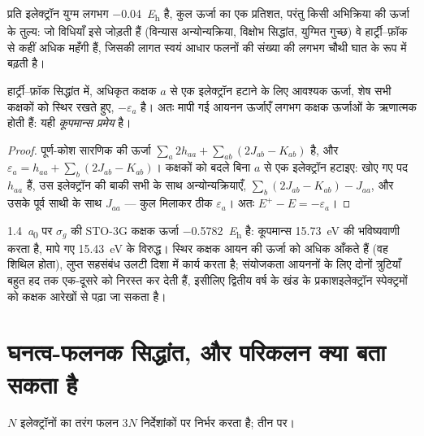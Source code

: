  प्रति इलेक्ट्रॉन युग्म लगभग \qty{-0.04}{\hartree} है, कुल ऊर्जा का
एक प्रतिशत, परंतु किसी अभिक्रिया की ऊर्जा के तुल्य:
जो विधियाँ इसे जोड़ती हैं (विन्यास अन्योन्यक्रिया, विक्षोभ सिद्धांत,
युग्मित गुच्छ) वे हार्ट्री--फ़ॉक से कहीं अधिक महँगी हैं, जिसकी लागत स्वयं
आधार फलनों की संख्या की लगभग चौथी घात के रूप में बढ़ती है।

\begin{theorem}[कूपमान्स प्रमेय]\label{thm:b3:computational-chemistry:koopmans}
हार्ट्री--फ़ॉक सिद्धांत में, अधिकृत कक्षक $a$ से एक इलेक्ट्रॉन हटाने के लिए
आवश्यक ऊर्जा, शेष सभी कक्षकों को स्थिर रखते हुए, $-\varepsilon_a$ है। अतः
मापी गई आयनन ऊर्जाएँ लगभग कक्षक ऊर्जाओं के ऋणात्मक होती हैं:
यही \emph{कूपमान्स प्रमेय} है।
\end{theorem}

\begin{proof}
पूर्ण-कोश सारणिक की ऊर्जा $\sum_a2h_{aa} + \sum_{ab}(2J_{ab} -
K_{ab})$ है, और $\varepsilon_a = h_{aa} + \sum_b(2J_{ab} - K_{ab})$। कक्षकों को बदले बिना
$a$ से एक इलेक्ट्रॉन हटाइए: खोए गए पद $h_{aa}$ हैं, उस इलेक्ट्रॉन की
बाकी सभी के साथ अन्योन्यक्रियाएँ, $\sum_b(2J_{ab} - K_{ab}) -
J_{aa}$, और उसके पूर्व साथी के साथ $J_{aa}$ --- कुल मिलाकर ठीक
$\varepsilon_a$। अतः $E^+ - E = -\varepsilon_a$।
\end{proof}

\begin{example}[\ce{H2} का आयनन]\label{ex:b3:computational-chemistry:koopmans}
\qty{1.4}{\bohr} पर $\sigma_g$ की STO-3G कक्षक ऊर्जा
\qty{-0.5782}{\hartree} है: कूपमान्स \qty{15.73}{eV} की भविष्यवाणी करता है, मापे गए
\qty{15.43}{eV} के विरुद्ध। स्थिर कक्षक आयन की ऊर्जा को अधिक आँकते हैं (वह
शिथिल होता), लुप्त सहसंबंध उलटी दिशा में कार्य करता है; संयोजकता
आयननों के लिए दोनों त्रुटियाँ बहुत हद तक एक-दूसरे को निरस्त कर देती हैं, इसीलिए द्वितीय वर्ष के
खंड के प्रकाशइलेक्ट्रॉन स्पेक्ट्रमों को कक्षक आरेखों से पढ़ा जा सकता है।
\end{example}

\section{घनत्व-फलनक सिद्धांत, और परिकलन क्या बता सकता है}

$N$ इलेक्ट्रॉनों का तरंग फलन $3N$ निर्देशांकों पर निर्भर करता है;
 तीन पर।

